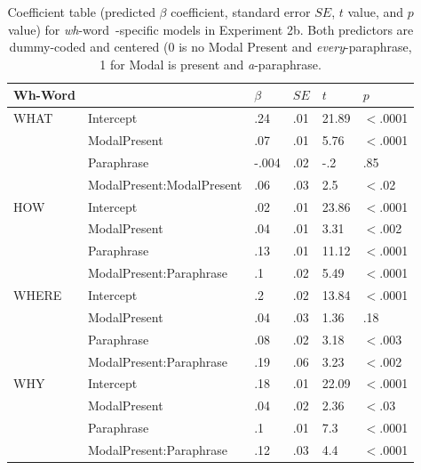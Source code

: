 \documentclass[12pt,letterpaper,table,svgnames,dvipsnames]{article}
\newcommand{\whw}{\emph{wh}-word~}
\begin{document}
\begin{table}
\begin{center} 
\caption{Coefficient table (predicted $\beta$ coefficient, standard error $SE$, $t$ value, and $p$ value) for \whw-specific models in Experiment 2b. Both predictors are dummy-coded and centered (0 is no Modal Present and \emph{every}-paraphrase, 1 for Modal is present and \emph{a}-paraphrase.} 
\label{sub-model_res_ex2b} 
\begin{tabular}{l|lllll} 
\toprule
Wh-Word & {} & $\beta$ & $SE$ & $t$ & $p$\\
\midrule
WHAT & Intercept & .24 & .01 & 21.89 & $<$.0001\\
{} & ModalPresent & .07 & .01 & 5.76 & $<$.0001\\
{} & Paraphrase & -.004 & .02 & -.2 & .85\\
{} & ModalPresent:ModalPresent & .06 & .03 & 2.5 & $<$.02\\
\midrule
HOW & Intercept & .02 & .01 & 23.86 & $<$.0001\\
{} & ModalPresent & .04 & .01 & 3.31 & $<$.002\\
{} & Paraphrase & .13 & .01 & 11.12 & $<$.0001\\
{} & ModalPresent:Paraphrase & .1 & .02 & 5.49 & $<$.0001\\
\midrule
WHERE & Intercept & .2 & .02 & 13.84 & $<$.0001\\
{} & ModalPresent & .04 & .03 & 1.36 & .18\\
{} & Paraphrase & .08 & .02 & 3.18 & $<$.003\\
{} & ModalPresent:Paraphrase & .19 & .06 & 3.23 & $<$.002\\
\midrule
WHY & Intercept & .18 & .01 & 22.09 & $<$.0001\\
{} & ModalPresent & .04 & .02 & 2.36 & $<$.03\\
{} & Paraphrase & .1 & .01 & 7.3 & $<$.0001\\
{} & ModalPresent:Paraphrase & .12 & .03 & 4.4 & $<$.0001\\

\end{tabular}
\end{center}
\end{table}
\end{document}

